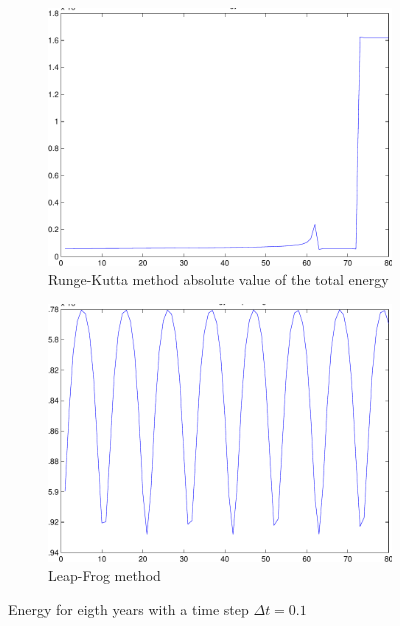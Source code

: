 \documentclass[a4paper,12pt, english]{article}
\begin{document}
\begin{figure}
        \centering
        \begin{subfigure}[b]{0.6\textwidth}
                \includegraphics[width=\textwidth]{main_totE_rk4_dt_0_1.pdf}
                \caption{Runge-Kutta method absolute value of the total energy}
                \label{fig:RK4_dt_0.1}
        \end{subfigure}%
       
        \begin{subfigure}[b]{0.8\textwidth}
                \includegraphics[width=\textwidth]{totE_main_lf_dt_0_1.pdf}
                \caption{Leap-Frog method}
                \label{fig:LF_dt_0.1}
        \end{subfigure}
        \caption{Energy for eigth years with a time step $\Delta t = 0.1$}
    
\end{figure}
\end{document}
